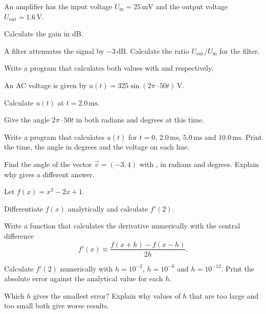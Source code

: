 An amplifier has the input voltage $U_{\text{in}} = 25\,\text{mV}$ and the output voltage
$U_{\text{out}} = 1.6\,\text{V}$.
\begin{parts}
  \item Calculate the gain in dB.
  \item A filter attenuates the signal by $-3\,\text{dB}$. Calculate the ratio
    $U_{\text{out}}/U_{\text{in}}$ for the filter.
  \item Write a program that calculates both values with  and 
    respectively.
\end{parts}

An AC voltage is given by $u(t) = 325\sin(2\pi \cdot 50t)\,\text{V}$.
\begin{parts}
  \item Calculate $u(t)$ at $t = 2.0\,\text{ms}$.
  \item Give the angle $2\pi \cdot 50t$ in both radians and degrees at this time.
  \item Write a program that calculates $u(t)$ for $t = 0$, $2.0\,\text{ms}$, $5.0\,\text{ms}$
    and $10.0\,\text{ms}$. Print the time, the angle in degrees and the voltage on each line.
  \item Find the angle of the vector $\vec{v} = (-3, 4)$ with , in radians and
    degrees. Explain why  gives a different answer.
\end{parts}


Let $f(x) = x^3 - 2x + 1$.
\begin{parts}
  \item Differentiate $f(x)$ analytically and calculate $f'(2)$.
  \item Write a function  that calculates the derivative numerically with the
    central difference
    \[
      f'(x) \approx \frac{f(x + h) - f(x - h)}{2h}.
    \]
  \item Calculate $f'(2)$ numerically with $h = 10^{-2}$, $h = 10^{-6}$ and $h = 10^{-12}$. Print
    the absolute error against the analytical value for each $h$.
  \item Which $h$ gives the smallest error? Explain why values of $h$ that are too large and too
    small both give worse results.
\end{parts}

